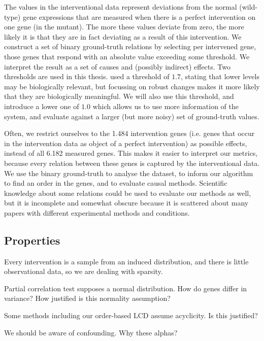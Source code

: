 The values in the interventional data represent deviations from the normal (wild-type) gene expressions that are measured when there is a perfect intervention on one gene (in the mutant). The more these values deviate from zero, the more likely it is that they are in fact deviating as a result of this intervention. We construct a set of binary ground-truth relations by selecting per intervened gene, those genes that respond with an absolute value exceeding some threshold. We interpret the result as a set of causes and (possibly indirect) effects. Two thresholds are used in this thesis. \citet{kemmeren2014large} used a threshold of $1.7$, stating that lower levels may be biologically relevant, but focussing on robust changes makes it more likely that they are biologically meaningful. We will also use this threshold, and introduce a lower one of $1.0$ which allows us to use more information of the system, and evaluate against a larger (but more noisy) set of ground-truth values. 

Often, we restrict ourselves to the 1.484 intervention genes (i.e. genes that occur in the intervention data as object of a perfect intervention) as possible effects, instead of all 6.182 measured genes. This makes it easier to interpret our metrics, because every relation between these genes is captured by the interventional data. We use the binary ground-truth to analyse the dataset, to inform our algorithm to find an order in the genes, and to evaluate causal methods. Scientific knowledge about some relations could be used to evaluate our methods as well, but it is incomplete and somewhat obscure because it is scattered about many papers with different experimental methods and conditions. 

\subsection{Properties}


Every intervention is a sample from an induced distribution, and there is little observational data, so we are dealing with sparsity. 

Partial correlation test supposes a normal distribution. How do genes differ in variance? How justified is this normality assumption?

Some methods including our order-based LCD assume acyclicity. Is this justified?

We should be aware of confounding. Why these alphas?


